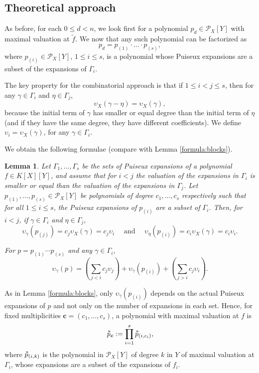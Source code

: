 \documentclass[a4paper,11pt]{amsart}%
\theoremstyle{definition}
\theoremstyle{plain}
\newtheorem{lemma}[defn]{Lemma}
\theoremstyle{remark}
\newcommand{\Px}{{\mathcal{P}_X}}
\newcommand{\vardbtilde}[1]{\tilde{\raisebox{0pt}[0.85\height]{$\tilde{#1}$}}}
\begin{document}
\subsection{Theoretical approach}
As before, for each $0 \le d < n$, we look first for a polynomial $p_d \in \Px[Y]$ with maximal valuation at $\tilde f$. We now that any such polynomial can be factorized as
$$
p_d = p_{(1)} \cdot \dots \cdot p_{(s)},
$$
where $p_{(i)} \in \Px[Y]$, $1 \le i \le s$, is a polynomial whose Puiseux expansions are a subset of the expansions of $\Gamma_i$.

The key
property for the combinatorial approach is that if $1 \leq i < j \leq s$, then for any $\gamma \in\Gamma_{i}$ and $\eta \in \Gamma_{j}$,
$$\upsilon_X(\gamma - \eta) = \upsilon_X(\gamma),$$
because the initial term of $\gamma$ has smaller or equal degree than the initial term of $\eta$ (and if they have the same degree, they have different coefficients). We define $\upsilon_i = \upsilon_X(\gamma)$, for any $\gamma \in \Gamma_i$.

We obtain the following formulae (compare with Lemma \ref{formula:blocks}).
\begin{lemma}
\label{formula:sets}
Let $\Gamma_1, \dots, \Gamma_s$ be the sets of Puiseux expansions of a polynomial $f \in K[X][Y]$, and assume that for $i < j$ the valuation of the expansions in $\Gamma_i$ is smaller or equal than the valuation of the expansions in $\Gamma_j$. Let $p_{(1)}, \dots, p_{(s)} \in \mathcal{P}_{X}[Y]$ be polynomials of degree $c_1, \dots, c_s$ respectively such that for all $1 \le i \le s$, the Puiseux expansions of $p_{(i)}$ are a subset of $\Gamma_i$. Then, for $i < j$, if $\gamma \in \Gamma_i$ and $\eta \in \Gamma_j$,
$$
\upsilon_{\gamma}(p_{(j)}) = c_j \upsilon_X(\gamma) = c_j \upsilon_i \quad \text{ and } \quad \upsilon_{\eta}(p_{(i)}) = c_i \upsilon_X(\gamma) = c_i \upsilon_i.
$$

For $p = p_{(1)} \cdots p_{(s)}$ and any $\gamma \in \Gamma_i$,
\[
\boxed{
\upsilon_{\gamma}(p) = \left(\textstyle \sum_{j < i} c_j \upsilon_j\right) + \upsilon_{\gamma}(p_{(i)}) + \left(\textstyle  \sum_{j > i} c_j \upsilon_i \right).}
\]
\end{lemma}

As in Lemma \ref{formula:blocks}, only $\upsilon_{\gamma}(p_{(i)})$ depends on the actual Puiseux expansions of $p$ and not only on the number of expansions in each set. Hence, for fixed multiplicities $\bm{c} = (c_1, \dots, c_s)$, a polynomial with
maximal valuation at $f$ is
$$\vardbtilde p_{\bm c} := \prod_{i = 1}^s \vardbtilde p_{(i, c_i)},$$
where $\vardbtilde p_{(i, k)}$ is the polynomial in $\mathcal{P}_{X}[Y]$ of degree $k$ in $Y$ of maximal valuation at $\Gamma_i$, whose expansions are a subset of the expansions of $f_i$.
\end{document}
